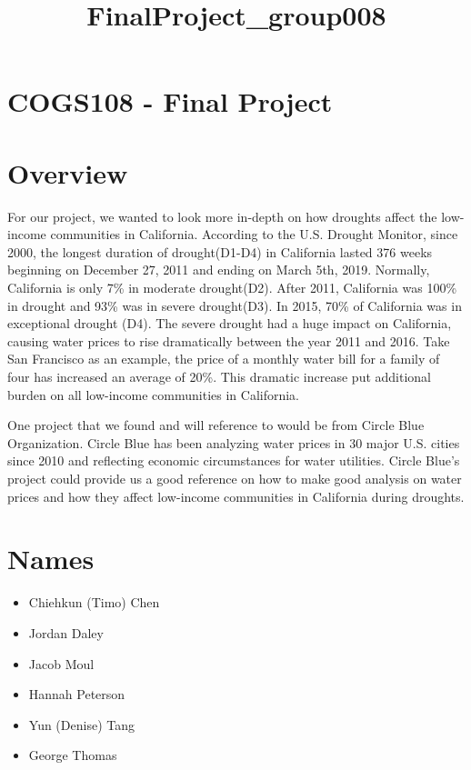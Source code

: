 \documentclass[11pt]{article}
\title{FinalProject\_group008}
\providecommand{\tightlist}{%
      \setlength{\itemsep}{0pt}\setlength{\parskip}{0pt}}
\begin{document}
    
    
    \maketitle
    
    

    
    \hypertarget{cogs108---final-project}{%
\section{COGS108 - Final Project}\label{cogs108---final-project}}

    \hypertarget{overview}{%
\section{Overview}\label{overview}}

    For our project, we wanted to look more in-depth on how droughts affect
the low-income communities in California. According to the U.S. Drought
Monitor, since 2000, the longest duration of drought(D1-D4) in
California lasted 376 weeks beginning on December 27, 2011 and ending on
March 5th, 2019. Normally, California is only 7\% in moderate
drought(D2). After 2011, California was 100\% in drought and 93\% was in
severe drought(D3). In 2015, 70\% of California was in exceptional
drought (D4). The severe drought had a huge impact on California,
causing water prices to rise dramatically between the year 2011 and
2016. Take San Francisco as an example, the price of a monthly water
bill for a family of four has increased an average of 20\%. This
dramatic increase put additional burden on all low-income communities in
California.

One project that we found and will reference to would be from Circle
Blue Organization. Circle Blue has been analyzing water prices in 30
major U.S. cities since 2010 and reflecting economic circumstances for
water utilities. Circle Blue's project could provide us a good reference
on how to make good analysis on water prices and how they affect
low-income communities in California during droughts.

    \hypertarget{names}{%
\section{Names}\label{names}}

\begin{itemize}
\tightlist
\item
  Chiehkun (Timo) Chen
\item
  Jordan Daley
\item
  Jacob Moul
\item
  Hannah Peterson
\item
  Yun (Denise) Tang
\item
  George Thomas
\end{itemize}
\end{document}
